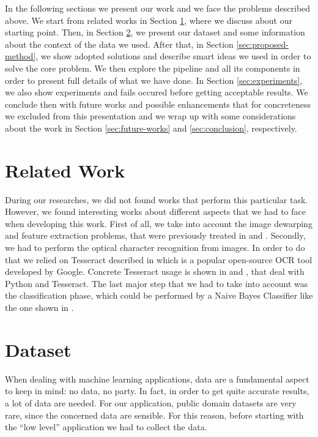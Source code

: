 \documentclass[10pt,twocolumn,letterpaper]{article}
\begin{document}
In the following sections we present our work and we face the problems
described above. We start from related works in Section
\ref{sec:related-work}, where we discuss about our starting
point. Then, in Section \ref{sec:dataset}, we present our dataset and
some information about the context of the data we used. After that, in
Section \ref{sec:proposed-method}, we show adopted solutions and
describe smart ideas we used in order to solve the core problem. We
then explore the pipeline and all its components in order to present
full details of what we have done. In Section \ref{sec:experiments},
we also show experiments and fails occured before getting acceptable
results. We conclude then with future works and possible enhancements
that for concreteness we excluded from this presentation and we wrap
up with some considerations about the work in Section
\ref{sec:future-works} and \ref{sec:conclusion}, respectively.

\section{Related Work}
\label{sec:related-work}

During our researches, we did not found works that perform this
particular task. However, we found interesting works about different
aspects that we had to face when developing this work.  First of all,
we take into account the image dewarping and feature extraction
problems, that were previously treated in \cite{Korber18} and
\cite{AbbasHussain17}.  Secondly, we had to perform the optical
character recognition from images. In order to do that we relied on
Tesseract described in \cite{Smith07} which is a popular open-source
OCR tool developed by Google. Concrete Tesseract usage is shown in
\cite{Benabderrazak20} and \cite{ZelicSable20}, that deal with Python
and Tesseract. The last major step that we had to take into account
was the classification phase, which could be performed by a Naive
Bayes Classifier like the one shown in \cite{ScikitTextDataTutorial}.

\section{Dataset}
\label{sec:dataset}

When dealing with machine learning applications, data are a
fundamental aspect to keep in mind: no data, no party. In fact, in
order to get quite accurate results, a lot of data are needed. For our
application, public domain datasets are very rare, since the concerned
data are sensible. For this reason, before starting with the ``low
level'' application we had to collect the data.
\end{document}
